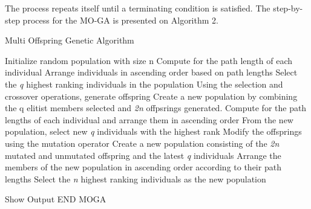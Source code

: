 The process repeats itself until a terminating condition is satisfied. The step-by-step process for the MO-GA is presented on Algorithm 2.

\begin{algorithm}
	\label{alg:MogaAlg}
	\begin{algorithmic}
		\caption{Multi Offspring Genetic Algorithm}
		\State Initialize random population with size n
		\State Compute for the path length of each individual
		\EndFor
		\State Arrange individuals in ascending order based on path lengths
		\State Select the \emph{q} highest ranking individuals in the population
		\State Using the selection and crossover operations, generate offspring
		\EndFor
		\State Create a new population by combining the q elitist members selected and \emph{2n} offpsrings generated.
		\State Compute for the path lengths of each individual and arrange them in ascending order
		\State From the new population, select new \emph{q} individuals with the highest rank
		\State Modify the offsprings using the mutation operator
		\EndFor
		\State Create a new population consisting of the \emph{2n} mutated and unmutated offspring and the latest \emph{q} individuals
		\State Arrange the members of the new population in ascending order according to their path lengths
		\State Select the \emph{n} highest ranking individuals as the new population
		
		\EndWhile
		\State Show Output 
		\State END MOGA  
	\end{algorithmic}
\end{algorithm}

